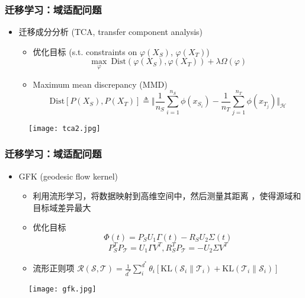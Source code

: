 \begin{frame}
    \frametitle{迁移学习：域适配问题}
    \begin{itemize}
        \item 迁移成分分析 (TCA, transfer component analysis)
            \begin{itemize}
                \item 优化目标 (s.t. constraints on $\varphi(X_S)$, $\varphi(X_T)$)
                $$\max_{\varphi}\  \text{Dist}(\varphi(X_S),\varphi(X_T)) + \lambda \Omega(\varphi)$$
                \item Maximum mean discrepancy (MMD)
                $$\text{Dist}[P(X_S),P(X_T)] \triangleq\Vert \frac{1}{n_S}\sum\limits_{i=1}^{n_S}\phi(x_{S_i})-\frac{1}{n_T}\sum\limits_{j=1}^{n_T}\phi(x_{T_j})\Vert_{\mathcal{H}}$$
            \end{itemize}
    \end{itemize}
    \begin{figure}
        \texttt{[image: tca2.jpg]}
    \end{figure}
\end{frame}

\begin{frame}
    \frametitle{迁移学习：域适配问题}
    \begin{itemize}
        \item GFK (geodesic flow kernel) 
            \begin{itemize}
                \item 利用流形学习，将数据映射到高维空间中，然后测量其距离 ，使得源域和目标域差异最大
                \item 优化目标
                    $$\Phi(t)=P_S U_1\Gamma(t) - R_S U_2\Sigma(t)$$
                    $$P_S^T P_{\mathcal{T}} = U_1 \Gamma V^T, R_S^T P_{\mathcal{T}} = -U_2 \Sigma V^T$$
                \item 流形正则项
                $\mathcal{R(S,T)} = \frac{1}{d^*} \sum_i^{d^*} \theta_i[\text{KL}(\mathcal{S}_i\parallel \mathcal{T}_i) + \text{KL}(\mathcal{T}_i\parallel \mathcal{S}_i)]
                $
            \end{itemize}
    \end{itemize}
    \begin{figure}
        \texttt{[image: gfk.jpg]}
    \end{figure}
\end{frame}


